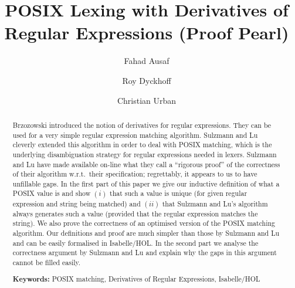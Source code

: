 \documentclass[runningheads]{llncs}
\begin{document}
\title{POSIX {L}exing with {D}erivatives of {R}egular {E}xpressions (Proof Pearl)}
\author{Fahad Ausaf \and Roy Dyckhoff \and Christian Urban}
\maketitle

\begin{abstract}

Brzozowski introduced the notion of derivatives for regular
expressions. They can be used for a very simple regular expression
matching algorithm.  Sulzmann and Lu cleverly extended this algorithm
in order to deal with POSIX matching, which is the underlying
disambiguation strategy for regular expressions needed in lexers.
Sulzmann and Lu have made available on-line what they call a
``rigorous proof'' of the correctness of their algorithm w.r.t.\ their
specification; regrettably, it appears to us to have unfillable gaps.
In the first part of this paper we give our inductive definition of
what a POSIX value is and show $(i)$ that such a value is unique (for
given regular expression and string being matched) and $(ii)$ that
Sulzmann and Lu's algorithm always generates such a value (provided
that the regular expression matches the string).  We also prove the
correctness of an optimised version of the POSIX matching
algorithm. Our definitions and proof are much simpler than those by
Sulzmann and Lu and can be easily formalised in Isabelle/HOL. In the
second part we analyse the correctness argument by Sulzmann and Lu and
explain why the gaps in this argument cannot be filled easily.\smallskip

{\bf Keywords:} POSIX matching, Derivatives of Regular Expressions,
Isabelle/HOL
\end{abstract}


\end{document}
